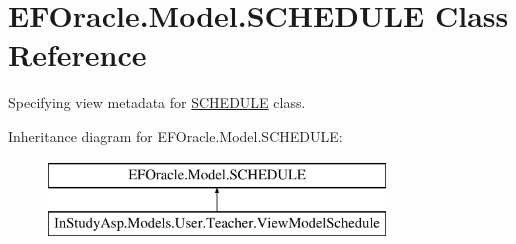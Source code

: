\hypertarget{class_e_f_oracle_1_1_model_1_1_s_c_h_e_d_u_l_e}{}\section{E\+F\+Oracle.\+Model.\+S\+C\+H\+E\+D\+U\+LE Class Reference}
\label{class_e_f_oracle_1_1_model_1_1_s_c_h_e_d_u_l_e}


Specifying view metadata for \hyperlink{class_e_f_oracle_1_1_model_1_1_s_c_h_e_d_u_l_e}{S\+C\+H\+E\+D\+U\+LE} class.  


Inheritance diagram for E\+F\+Oracle.\+Model.\+S\+C\+H\+E\+D\+U\+LE\+:\begin{figure}[H]
\begin{center}
\leavevmode
\includegraphics[height=2.000000cm]{class_e_f_oracle_1_1_model_1_1_s_c_h_e_d_u_l_e}
\end{center}
\end{figure}
